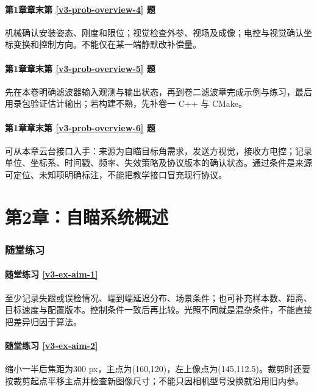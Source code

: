 \paragraph*{第1章章末第 \ref{v3-prob-overview-4} 题}
\begin{solution}
机械确认安装姿态、刚度和限位；视觉检查外参、视场及成像；电控与视觉确认坐标变换和控制方向。不能仅在某一端静默改补偿量。
\end{solution}

\paragraph*{第1章章末第 \ref{v3-prob-overview-5} 题}
\begin{solution}
先在本卷明确滤波器输入观测与输出状态，再到卷二滤波章完成示例与练习，最后用录包验证估计输出；若构建不熟，先补卷一 C++ 与 CMake。
\end{solution}

\paragraph*{第1章章末第 \ref{v3-prob-overview-6} 题}
\begin{solution}
可从本章云台接口入手：来源为自瞄目标角需求，发送方视觉，接收方电控；记录单位、坐标系、时间戳、频率、失效策略及协议版本的确认状态。通过条件是来源可定位、未知项明确标注，不能把教学接口冒充现行协议。
\end{solution}

\section*{第2章：自瞄系统概述}
{}
\subsubsection*{随堂练习}
\paragraph*{随堂练习 \ref{v3-ex-aim-1}}
\begin{solution}
至少记录失跟或误检情况、端到端延迟分布、场景条件；也可补充样本数、距离、目标速度与配置版本。控制条件一致后再比较。光照不同就是混杂条件，不能直接把差异归因于算法。
\end{solution}

\paragraph*{随堂练习 \ref{v3-ex-aim-2}}
\begin{solution}
缩小一半后焦距为300 px，主点为(160,120)，左上像点为(145,112.5)。裁剪时还要按裁剪起点平移主点并检查新图像尺寸；不能只因相机型号没换就沿用旧内参。
\end{solution}

